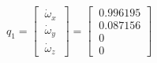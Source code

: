 \documentclass[preview]{standalone}
\begin{document}
\begin{center}
$q_1 = \begin{bmatrix}\
                    \dot{\omega}_x \\\
                    \dot{\omega}_y \\\
                    \dot{\omega}_z\
                \end{bmatrix} = \begin{bmatrix}\
                    0.996195 \\\
                    0.087156 \\\
                    0 \\\
                    0\
                \end{bmatrix}$
\end{center}
\end{document}

